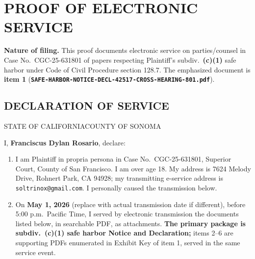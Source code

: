 \newcommand{\docshorttitle}{POS-050 --- Safe Harbor Serv.\ (\textsection~128.7(c)(1)) CGC-25-631801}
\newcommand{\doctitleblock}{PROOF OF ELECTRONIC SERVICE (POS-050 / EFS-050 FORMAT)}
\newcommand{\docsubblock}{(Judicial Council POS-050 / EFS-050 [Rev.\ Feb.\ 1, 2017]\textemdash proof follows same operative elements as optional Judicial Council forms; Code Civ.\ Proc., \textsection\textsection~1010.6, 1013a; Cal.\ Rules of Court, rule 2.251)}




\section*{PROOF OF ELECTRONIC SERVICE}

\textbf{Nature of filing.} This proof documents electronic service on parties/counsel in Case No.\ CGC-25-631801 of papers respecting Plaintiff's subdiv.\ \textbf{(c)(1)} safe harbor under Code of Civil Procedure section 128.7. The emphasized document is \textbf{item 1} (\texttt{\textbf{SAFE-HARBOR-NOTICE-DECL-42517-CROSS-HEARING-801.pdf}}).\par\vspace{\baselineskip}

\subsection*{DECLARATION OF SERVICE}

STATE OF CALIFORNIA\hfill COUNTY OF SONOMA\vspace{\baselineskip}

I, \textbf{Franciscus Dylan Rosario}, declare:\vspace{-0.25\baselineskip}

\begin{enumerate}
\item I am Plaintiff in propria persona in Case No.\ CGC-25-631801, Superior Court, County of San Francisco. I am over age 18. My address is 7624 Melody Drive, Rohnert Park, CA 94928; my transmitting e-service address is \texttt{soltrinox@gmail.com}. I personally caused the transmission below.
\item On \textbf{May 1, 2026} (replace with actual transmission date if different), before 5:00 p.m.\ Pacific Time, I served by electronic transmission the documents listed below, in searchable PDF, as attachments. \textbf{The primary package is subdiv.\ (c)(1) safe harbor Notice and Declaration;} items 2--6 are supporting PDFs enumerated in Exhibit Key of item 1, served in the same service event.\par\vspace{\baselineskip}
\end{enumerate}

